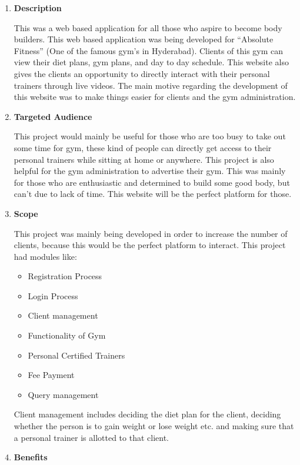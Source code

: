 \documentclass[fleqn,10pt]{../SelfArx} %
\begin{document}
\vspace{0.5cm}
\begin{enumerate}
\item \textbf{Description}

This was a web based application for all those who aspire to become body builders. This web based application was being developed for “Absolute Fitness” (One of the famous gym’s in Hyderabad). Clients of this gym can view their diet plans, gym plans, and day to day schedule. This website also gives the clients an opportunity to directly interact with their personal trainers through live videos. The main motive regarding the development of this website was to make things easier for clients and the gym administration.

\item \textbf{ Targeted Audience}

This project would mainly be useful for those who are too busy to take out some time for gym, these kind of people can directly get access to their personal trainers while sitting at home or anywhere. This project is also helpful for the gym administration to advertise their gym. This was mainly for those who are enthusiastic and determined to build some good body, but can’t due to lack of time. This website will be the perfect platform for those.

\item \textbf{Scope}

This project was mainly being developed in order to increase the number of clients, because this would be the perfect platform to interact. This project had modules like:
\begin{itemize}
    \item 	Registration Process
 \item 	Login Process
 \item 	Client management
 \item 	Functionality of Gym
 \item 	Personal Certified Trainers
 \item 	Fee Payment
 \item 	Query management
\end{itemize}


Client management includes deciding the diet plan for the client, deciding whether the person is to gain weight or lose weight etc. and making sure that a personal trainer is allotted to that client.

\item \textbf{Benefits}


\end{enumerate}
\end{document}
